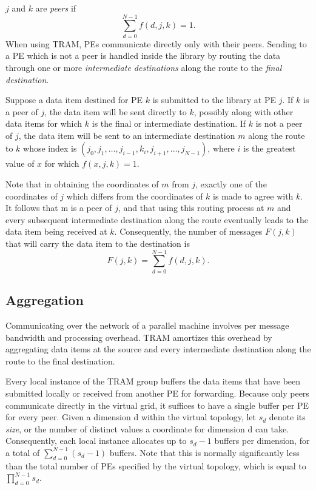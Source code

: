 $j$ and $k$ are \emph{peers} if
\[
\sum_{d=0}^{N-1} f(d, j, k) = 1 .
\]
When using TRAM, PEs communicate directly only with their
peers. Sending to a PE which is not a peer is handled inside the
library by routing the data through one or more \emph{intermediate
  destinations} along the route to the \emph{final destination}.

Suppose a data item destined for PE $k$ is submitted to the library at
PE $j$. If $k$ is a peer of $j$, the data item will be sent directly
to $k$, possibly along with other data items for which $k$ is the
final or intermediate destination.  If $k$ is not a peer of $j$, the
data item will be sent to an intermediate destination $m$ along the
route to $k$ whose index is $\left (j_0, j_1, \ldots, j_{i-1}, k_i,
j_{i+1}, \ldots, j_{N-1} \right)$, where $i$ is the greatest value of
$x$ for which $f(x, j, k) = 1$.

Note that in obtaining the coordinates of $m$ from $j$, exactly one of
the coordinates of $j$ which differs from the coordinates of $k$ is
made to agree with $k$. It follows that m is a peer of $j$, and that
using this routing process at $m$ and every subsequent intermediate
destination along the route eventually leads to the data item being
received at $k$. Consequently, the number of messages $F(j, k)$ that
will carry the data item to the destination is
\[
F(j,k) = \sum_{d=0}^{N-1}f(d, j, k) .
\]

\subsection{Aggregation}

Communicating over the network of a parallel machine involves per
message bandwidth and processing overhead. TRAM amortizes
this overhead by aggregating data items at the source and every
intermediate destination along the route to the final destination.

Every local instance of the TRAM group buffers the data items that have been
submitted locally or received from another PE for forwarding. Because only peers
communicate directly in the virtual grid, it suffices to have a single buffer
per PE for every peer. Given a dimension d within the virtual topology, let
$s_d$ denote its \emph{size}, or the number of distinct values a coordinate for
dimension d can take. Consequently, each local instance allocates up to $s_d - 1
$ buffers per dimension, for a total of $\sum_{d=0}^{N-1} (s_d - 1) $
buffers. Note that this is normally significantly less than the total number of
PEs specified by the virtual topology, which is equal to $\prod_{d=0}^{N-1}
{s_d}$.

